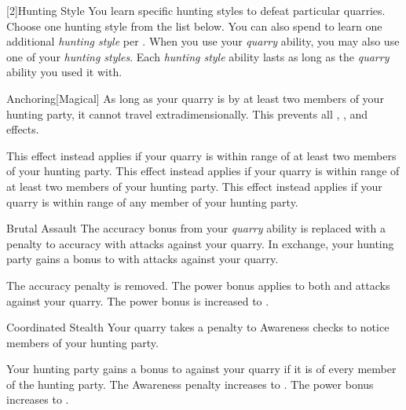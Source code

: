         [2]{Hunting Style}
        You learn specific hunting styles to defeat particular quarries.
        Choose one hunting style from the list below.
        You can also spend  to learn one additional \textit{hunting style} per .
        When you use your \textit{quarry} ability, you may also use one of your \textit{hunting styles}.
        Each \textit{hunting style} ability lasts as long as the \textit{quarry} ability you used it with.
        {
            \begin{freeability}{Anchoring}[Magical]
                As long as your quarry is  by at least two members of your hunting party, it cannot travel extradimensionally.
                This prevents all , , and  effects.

                \rankline
                 This effect instead applies if your quarry is within \rngmed range of at least two members of your hunting party.
                 This effect instead applies if your quarry is within \rnglong range of at least two members of your hunting party.
                 This effect instead applies if your quarry is within \rnglong range of any member of your hunting party.
            \end{freeability}

            \begin{freeability}{Brutal Assault}
                The accuracy bonus from your \textit{quarry} ability is replaced with a  penalty to accuracy with  attacks against your quarry.
                In exchange, your hunting party gains a  bonus to  with  attacks against your quarry.

                \rankline
                 The accuracy penalty is removed.
                 The power bonus applies to both  and  attacks against your quarry.
                 The power bonus is increased to .
            \end{freeability}

            \begin{freeability}{Coordinated Stealth}
                Your quarry takes a  penalty to Awareness checks to notice members of your hunting party.

                \rankline
                 Your hunting party gains a  bonus to  against your quarry if it is \unaware of every member of the hunting party.
                 The Awareness penalty increases to .
                 The power bonus increases to .
            \end{freeability}

}
